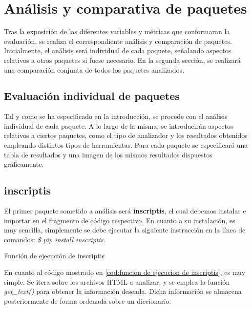 \chapter{Análisis y comparativa de paquetes}
\label{cha:analisis y comparativa de paquetes}

Tras la exposición de las diferentes variables y métricas que conformaran la evaluación, se realiza el
correspondiente análisis y comparación de paquetes. Inicialmente, el análisis será individual de cada
paquete, señalando aspectos relativos a otros paquetes si fuese necesario. En la segunda sección, se 
realizará una comparación conjunta de todos los paquetes analizados.

\section{Evaluación individual de paquetes}
\label{sec:evaluacion individual de paquetes}

Tal y como se ha especificado en la introducción, se procede con el análisis individual de cada paquete.
A lo largo de la misma, se introducirán aspectos relativos a ciertos paquetes, como el tipo de analizador
y los resultados obtenidos empleando distintos tipos de herramientas. Para cada paquete se especificará 
una tabla de resultados y una imagen de los mismos resultados dispuestos gráficamente.

\section*{inscriptis}

El primer paquete sometido a análisis será \textbf{inscriptis}, el cual debemos instalar e importar en el
fragmento de código respectivo. En cuanto a su instalación, es muy sencilla, simplemente se debe ejecutar
la siguiente instrucción en la línea de comandos: \emph{\$ pip install inscriptis}.

\begin{codefloat}
    
    \caption{Función de ejecución de inscriptis}
    \label{cod:funcion de ejecucion de inscriptis}
\end{codefloat}

En cuanto al código mostrado en \ref{cod:funcion de ejecucion de inscriptis}, es muy simple. Se itera sobre 
los archivos HTML a analizar, y se emplea la función \emph{get\_text()} para obtener la información deseada. 
Dicha información se almacena posteriormente de forma ordenada sobre un diccionario.

